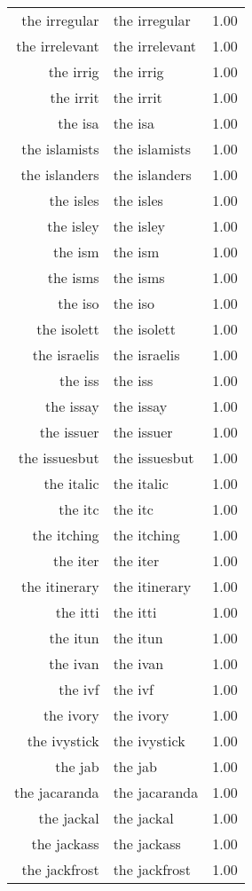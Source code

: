 \begin{table}[ht]
\begin{tabular}{rlr}
  the irregular & the irregular & 1.00 \\ 
  the irrelevant & the irrelevant & 1.00 \\ 
  the irrig & the irrig & 1.00 \\ 
  the irrit & the irrit & 1.00 \\ 
  the isa & the isa & 1.00 \\ 
  the islamists & the islamists & 1.00 \\ 
  the islanders & the islanders & 1.00 \\ 
  the isles & the isles & 1.00 \\ 
  the isley & the isley & 1.00 \\ 
  the ism & the ism & 1.00 \\ 
  the isms & the isms & 1.00 \\ 
  the iso & the iso & 1.00 \\ 
  the isolett & the isolett & 1.00 \\ 
  the israelis & the israelis & 1.00 \\ 
  the iss & the iss & 1.00 \\ 
  the issay & the issay & 1.00 \\ 
  the issuer & the issuer & 1.00 \\ 
  the issuesbut & the issuesbut & 1.00 \\ 
  the italic & the italic & 1.00 \\ 
  the itc & the itc & 1.00 \\ 
  the itching & the itching & 1.00 \\ 
  the iter & the iter & 1.00 \\ 
  the itinerary & the itinerary & 1.00 \\ 
  the itti & the itti & 1.00 \\ 
  the itun & the itun & 1.00 \\ 
  the ivan & the ivan & 1.00 \\ 
  the ivf & the ivf & 1.00 \\ 
  the ivory & the ivory & 1.00 \\ 
  the ivystick & the ivystick & 1.00 \\ 
  the jab & the jab & 1.00 \\ 
  the jacaranda & the jacaranda & 1.00 \\ 
  the jackal & the jackal & 1.00 \\ 
  the jackass & the jackass & 1.00 \\ 
  the jackfrost & the jackfrost & 1.00 \\ 

\end{tabular}
\end{table}
